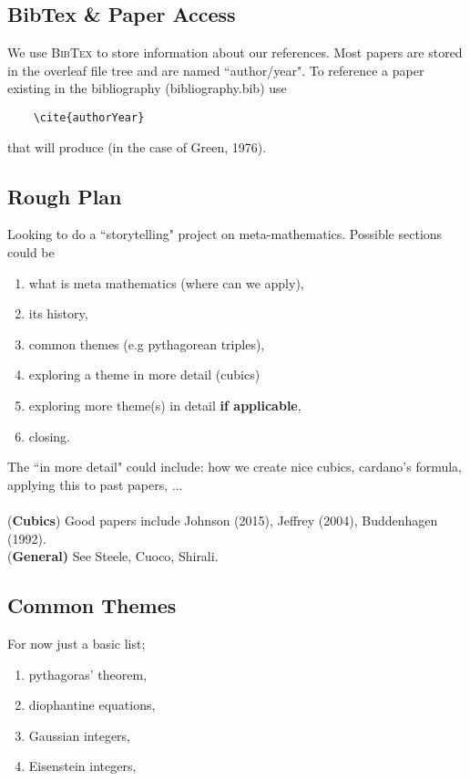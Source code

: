 \documentclass[12pt]{article}
\begin{document}
\subsection{BibTex \& Paper Access}
We use \textsc{BibTex} to store information about our references. Most papers are stored in the overleaf file tree and are named ``author/year". To reference a paper existing in the bibliography (bibliography.bib) use
\begin{verbatim}
    \cite{authorYear}
\end{verbatim}
that will produce \cite{green1976} (in the case of Green, 1976).

\subsection{Rough Plan}
Looking to do a ``storytelling" project on meta-mathematics. Possible sections could be
\begin{enumerate}[itemsep=-2mm]
    \item what is meta mathematics (where can we apply),
    \item its history,
    \item common themes (e.g pythagorean triples),
    \item exploring a theme in more detail (cubics)
    \item exploring more theme(s) in detail \textbf{if applicable},
    \item closing.
\end{enumerate}

\noindent The ``in more detail" could include: how we create nice cubics, cardano's formula, applying this to past papers, ...\\\\
(\textbf{Cubics}) Good papers include Johnson (2015), Jeffrey (2004), Buddenhagen (1992).\\
(\textbf{General)} See Steele, Cuoco, Shirali.

\subsection{Common Themes}
For now just a basic list;
\begin{enumerate}[itemsep=-2mm]
    \item pythagoras' theorem,
    \item diophantine equations,
    \item Gaussian integers,
    \item Eisenstein integers,
    
\end{enumerate}
\end{document}
